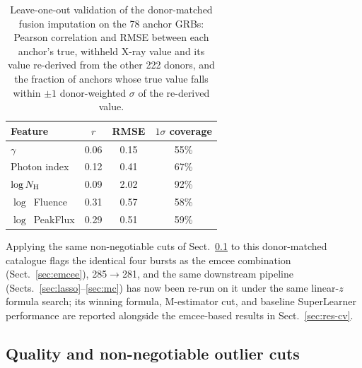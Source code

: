 \documentclass{aa}
\newcommand{\NH}{N_{\rm H}}
\begin{document}
\begin{table}
  \centering
  \caption{Leave-one-out validation of the donor-matched fusion imputation on the
    78 anchor GRBs: Pearson correlation and RMSE between each anchor's true,
    withheld X-ray value and its value re-derived from the other 222 donors, and
    the fraction of anchors whose true value falls within $\pm1$ donor-weighted
    $\sigma$ of the re-derived value.}
  \label{tab:otloo}
  \begin{tabular}{lccc}
    \hline\hline
    Feature & $r$ & RMSE & $1\sigma$ coverage \\
    \hline
    $\gamma$            & 0.06 & 0.15 & 55\% \\
    Photon index        & 0.12 & 0.41 & 67\% \\
    $\log \NH$          & 0.09 & 2.02 & 92\% \\
    $\log$~Fluence      & 0.31 & 0.57 & 58\% \\
    $\log$~PeakFlux     & 0.29 & 0.51 & 59\% \\
    \hline
  \end{tabular}
\end{table}

Applying the same non-negotiable cuts of Sect.~\ref{sec:cuts} to this
donor-matched catalogue flags the identical four bursts as the emcee combination
(Sect.~\ref{sec:emcee}), 285$\rightarrow$281, and the same downstream pipeline
(Sects.~\ref{sec:lasso}--\ref{sec:mc}) has now been re-run on it under the same
linear-$z$ formula search; its winning formula, M-estimator cut, and baseline
SuperLearner performance are reported alongside the emcee-based results in
Sect.~\ref{sec:res-cv}.

\subsection{Quality and non-negotiable outlier cuts}
\label{sec:cuts}
\end{document}
